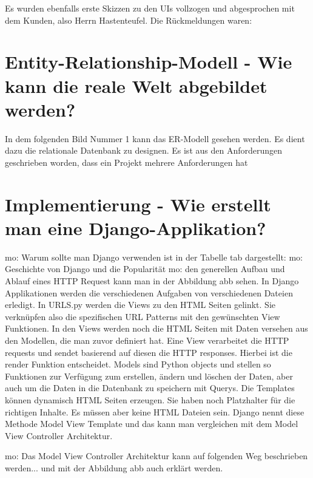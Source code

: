 \documentclass[11pt,a4paper]{report}
\begin{document}
Es wurden ebenfalls erste Skizzen zu den UIs vollzogen und abgesprochen mit dem Kunden, also Herrn Hastenteufel.
Die Rückmeldungen waren:

\chapter{Entity-Relationship-Modell - Wie kann die reale Welt abgebildet werden?} \label{chap:erm}

In dem folgenden Bild Nummer 1 kann das ER-Modell gesehen werden. Es dient dazu die relationale Datenbank zu designen. Es ist aus den Anforderungen geschrieben worden, dass ein Projekt mehrere Anforderungen hat



\chapter{Implementierung - Wie erstellt man eine Django-Applikation?} \label{chap:einf}

mo: Warum sollte man Django verwenden ist in der Tabelle tab dargestellt:
mo: Geschichte von Django und die Popularität
mo: den generellen Aufbau und Ablauf eines HTTP Request kann man in der Abbildung abb sehen. In Django Applikationen werden die verschiedenen Aufgaben von verschiedenen Dateien erledigt. In URLS.py werden die Views zu den HTML Seiten gelinkt. Sie verknüpfen also die spezifischen URL Patterns mit den gewünschten View Funktionen. In den Views werden noch die HTML Seiten mit Daten versehen aus den Modellen, die man zuvor definiert hat. Eine View verarbeitet die HTTP requests und sendet basierend auf diesen die HTTP responses. Hierbei ist die render Funktion entscheidet. Models sind Python objects und stellen so Funktionen zur Verfügung zum erstellen, ändern und löschen der Daten, aber auch um die Daten in die Datenbank zu speichern mit Querys. Die Templates können dynamisch HTML Seiten erzeugen. Sie haben noch Platzhalter für die richtigen Inhalte. Es müssen aber keine HTML Dateien sein. Django nennt diese Methode Model View Template und das kann man vergleichen mit dem Model View Controller Architektur.

mo: Das Model View Controller Architektur kann auf folgenden Weg beschrieben werden... und mit der Abbildung abb auch erklärt werden.
\end{document}
